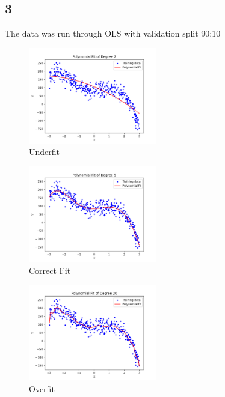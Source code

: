 \subsection{3}
The data was run through OLS with validation split 90:10\\
\vspace{-2em}
\begin{figure}[H]
    \centering
    \includegraphics[width=0.5\textwidth]{./images/3/3_underfit.png}
    \vspace{-10pt}
    \caption{Underfit}
\end{figure}
\vspace{-15pt}
\begin{figure}[H]
    \centering
    \includegraphics[width=0.5\textwidth]{./images/3/3_correctfit.png}
    \vspace{-10pt}
    \caption{Correct Fit}
\end{figure}
\vspace{-15pt}
\begin{figure}[H]
    \centering
    \includegraphics[width=0.5\textwidth]{./images/3/3_overfit.png}
     \vspace{-10pt}
    \caption{Overfit}
\end{figure}



